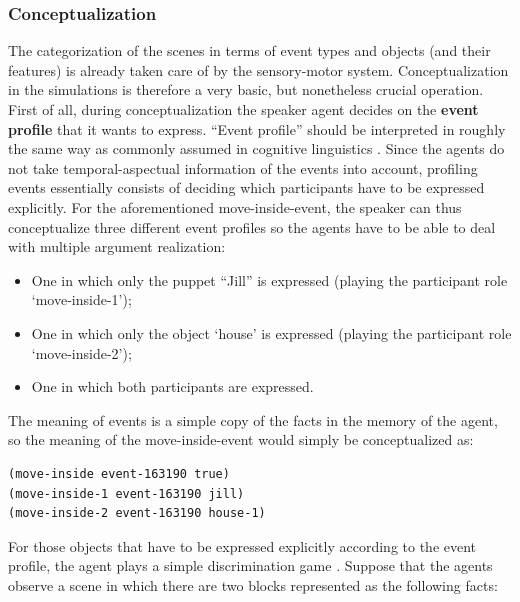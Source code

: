 \subsubsection{Conceptualization}
 The categorization of the scenes in terms of event types and objects (and their features) is already taken care of by the sensory-motor system. Conceptualization in the simulations is therefore a very basic, but nonetheless crucial operation. First of all, during conceptualization the speaker agent decides on the {\bfseries event profile} that it wants to express. ``Event profile'' should be interpreted in roughly the same way as commonly assumed in cognitive linguistics \citep[see for instance][]{croft98event}. Since the agents do not take temporal-aspectual information of the events into account, profiling events essentially consists of deciding which participants have to be expressed explicitly. For the aforementioned move-inside-event, the speaker can thus conceptualize three different event profiles so the agents have to be able to deal with multiple argument realization:

\begin{itemize}
\item One in which only the puppet ``Jill'' is expressed (playing the participant role `move-inside-1');
\item One in which only the object `house' is expressed (playing the participant role `move-inside-2');
\item One in which both participants are expressed.
\end{itemize}

The meaning of events is a simple copy of the facts in the memory of the agent, so the meaning of the move-inside-event would simply be conceptualized as:

\ea
\label{facts2}
\begin{lstlisting}
(move-inside event-163190 true)
(move-inside-1 event-163190 jill)
(move-inside-2 event-163190 house-1)
\end{lstlisting}
\z

For those objects that have to be expressed explicitly according to the event profile, the agent plays a simple discrimination game \citep{steels96perceptually, steels97constructing}. Suppose that the agents observe a scene in which there are two blocks represented as the following facts:

